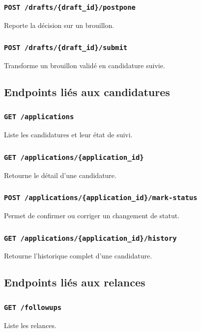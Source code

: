 \documentclass[11pt,a4paper]{article}
\begin{document}
\subsubsection{\texttt{POST /drafts/\{draft\_id\}/postpone}}
Reporte la décision sur un brouillon.

\subsubsection{\texttt{POST /drafts/\{draft\_id\}/submit}}
Transforme un brouillon validé en candidature suivie.

\subsection{Endpoints liés aux candidatures}

\subsubsection{\texttt{GET /applications}}
Liste les candidatures et leur état de suivi.

\subsubsection{\texttt{GET /applications/\{application\_id\}}}
Retourne le détail d’une candidature.

\subsubsection{\texttt{POST /applications/\{application\_id\}/mark-status}}
Permet de confirmer ou corriger un changement de statut.

\subsubsection{\texttt{GET /applications/\{application\_id\}/history}}
Retourne l’historique complet d’une candidature.

\subsection{Endpoints liés aux relances}

\subsubsection{\texttt{GET /followups}}
Liste les relances.
\end{document}
